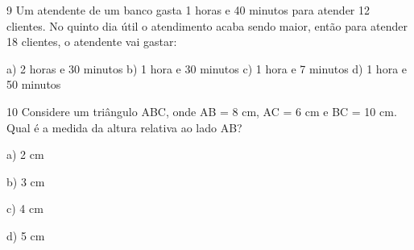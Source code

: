 \num{9} Um atendente de um banco gasta 1 horas e 40 minutos para atender 12
clientes. No quinto dia útil o atendimento acaba sendo maior, então para
atender 18 clientes, o atendente vai gastar:

a) 2 horas e 30 minutos b) 1 hora e 30 minutos c) 1 hora e 7 minutos d)
1 hora e 50 minutos



\num{10} Considere um triângulo ABC, onde AB = 8 cm, AC = 6 cm e BC = 10 cm.
Qual é a medida da altura relativa ao lado AB?

a) 2 cm

b) 3 cm

c) 4 cm

d) 5 cm




